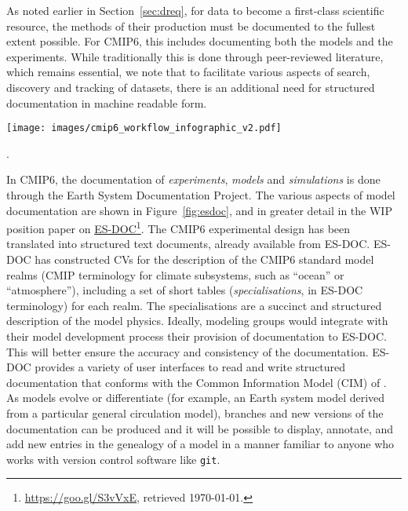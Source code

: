 \documentclass[gmd,manuscript]{copernicus}
\newcommand{\pllabel}[1]{\label{p-#1}\linelabel{l-#1}}
\newcommand{\urlref}[2] {\href{#1}{#2}\footnote{\url{#1}, retrieved \today.}}
\begin{document}
As noted earlier in Section~\ref{sec:dreq}, for data to become a
first-class scientific resource, the methods of their production must
be documented to the fullest extent possible. For CMIP6, this includes
documenting both the models and the experiments. While traditionally
this is done through peer-reviewed literature, which remains
essential, we note that to facilitate various aspects of search,
discovery and tracking of datasets, there is an additional need for
structured documentation in machine readable form.

\begin{figure*}
  \begin{center}
    \texttt{[image: images/cmip6\_workflow\_infographic\_v2.pdf]}
  \end{center}
  \caption{Elements of ES-DOC documentation. Rows indicate phases of
    the modeling process being documented, and box colors indicate the
    parties responsible for producing the documentation (see legend).
    Figure courtesy Guillaume Levavasseur, IPSL}.
  \label{fig:esdoc}
\end{figure*}

In CMIP6, the documentation of \emph{experiments}, \emph{models} and
\emph{simulations} is done through the Earth System Documentation
\citep[\urlref{https://goo.gl/WNwKD9}{ES-DOC},][]{ref:guilyardietal2013}
Project. The various aspects of model documentation are shown in
Figure~\ref{fig:esdoc}, and in greater detail in the WIP position
paper on \urlref{https://goo.gl/S3vVxE}{ES-DOC}. The CMIP6
experimental design has been translated into structured text
documents, already available from ES-DOC. ES-DOC has constructed CVs
for the description of the CMIP6 standard model realms
\pllabel{RC1-52}
(CMIP terminology for climate subsystems, such as ``ocean'' or
``atmosphere''), including a set of short tables
(\emph{specialisations}, in ES-DOC terminology) for each realm.
\pllabel{RC1-53}
The specialisations are a succinct and structured description of the
model physics. Ideally, modeling groups would integrate with their
model development process their provision of documentation to ES-DOC.
This will better ensure the accuracy and consistency of the
documentation. ES-DOC provides a variety of user interfaces to read
and write structured documentation that conforms with the Common
Information Model (CIM) of \cite{ref:lawrenceetal2012}. As models
evolve or differentiate (for example, an Earth system model derived
from a particular general circulation model), branches and new
versions of the documentation can be produced
\pllabel{RC1-54}
and it will be possible to display, annotate, and add new entries in
the genealogy of a model in a manner familiar to anyone who works with
version control software like \texttt{git}.
\end{document}
